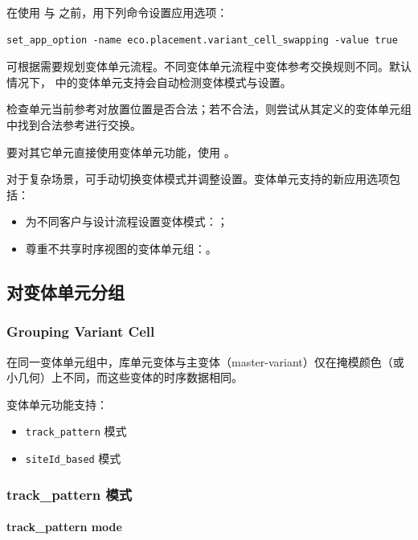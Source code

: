 在使用  与  之前，用下列命令设置应用选项：
\begin{lstlisting}
set_app_option -name eco.placement.variant_cell_swapping -value true
\end{lstlisting}

可根据需要规划变体单元流程。不同变体单元流程中变体参考交换规则不同。默认情况下， 中的变体单元支持会自动检测变体模式与设置。

 检查单元当前参考对放置位置是否合法；若不合法，则尝试从其定义的变体单元组中找到合法参考进行交换。

要对其它单元直接使用变体单元功能，使用 。

对于复杂场景，可手动切换变体模式并调整设置。变体单元支持的新应用选项包括：
\begin{itemize}
  \item 为不同客户与设计流程设置变体模式：；
  \item 尊重不共享时序视图的变体单元组：。
\end{itemize}

\subsection{对变体单元分组}
\subsubsection*{Grouping Variant Cell}

在同一变体单元组中，库单元变体与主变体（master-variant）仅在掩模颜色（或小几何）上不同，而这些变体的时序数据相同。

变体单元功能支持：
\begin{itemize}
  \item \texttt{track\_pattern} 模式
  \item \texttt{siteId\_based} 模式
\end{itemize}

\subsubsection{track\_pattern 模式}
\paragraph*{track\_pattern mode}

